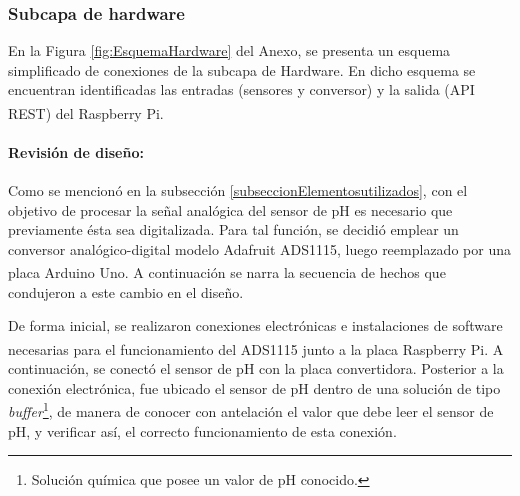                 
            \subsubsection{Subcapa de hardware} 
                \par En la Figura \ref{fig:EsquemaHardware} del Anexo, se presenta un esquema simplificado de conexiones de la subcapa de Hardware. En dicho esquema se encuentran identificadas las entradas (sensores y conversor) y la salida (API REST) del Raspberry\textsuperscript{\textregistered} Pi.
                
                \paragraph{Revisión de diseño:}
                 Como se mencionó en la subsección \ref{subseccionElementosutilizados}, con el objetivo de procesar la señal analógica del sensor de pH es necesario que previamente ésta sea digitalizada. Para tal función, se decidió emplear un conversor analógico-digital modelo Adafruit ADS1115, luego reemplazado por una placa Arduino\textsuperscript{\textregistered} Uno. A continuación se narra la secuencia de hechos que condujeron a este cambio en el diseño.
                
                \par De forma inicial, se realizaron conexiones electrónicas e instalaciones de software necesarias para el funcionamiento del ADS1115 junto a la placa Raspberry\textsuperscript{\textregistered} Pi. A continuación, se conectó el sensor de pH con la placa convertidora. Posterior a la conexión electrónica, fue ubicado el sensor de pH dentro de una solución de tipo \textit{buffer}\footnote{Solución química que posee un valor de pH conocido.}, de manera de conocer con antelación el valor que debe leer el sensor de pH, y verificar así, el correcto funcionamiento de esta conexión.
                

